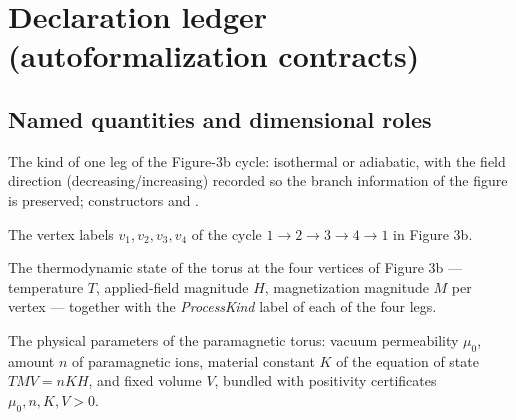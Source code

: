 \section*{Declaration ledger (autoformalization contracts)}

\subsection*{Named quantities and dimensional roles}

\begin{definition}
\label{def:IPhO2026Problems_problem_IPhO_2026_3_C_3:ProcessKind}
The kind of one leg of the Figure-3b cycle: isothermal or adiabatic, with the
field direction (decreasing/increasing) recorded so the branch information of
the figure is preserved; constructors
 and
.
\end{definition}

\begin{definition}
\label{def:IPhO2026Problems_problem_IPhO_2026_3_C_3:Vertex}
The vertex labels $v_1, v_2, v_3, v_4$ of the cycle $1 \to 2 \to 3 \to 4 \to 1$
in Figure 3b.
\end{definition}

\begin{definition}
\label{def:IPhO2026Problems_problem_IPhO_2026_3_C_3:CarnotCycle}
The thermodynamic state of the torus at the four vertices of Figure 3b —
temperature $T$, applied-field magnitude $H$, magnetization magnitude $M$ per
vertex — together with the \emph{ProcessKind} label of each of the four legs.
\end{definition}

\begin{definition}
\label{def:IPhO2026Problems_problem_IPhO_2026_3_C_3:TorusParams}
The physical parameters of the paramagnetic torus: vacuum permeability
$\mu_0$, amount $n$ of paramagnetic ions, material constant $K$ of the
equation of state $T M V = n K H$, and fixed volume $V$, bundled with
positivity certificates $\mu_0, n, K, V > 0$.
\end{definition}

